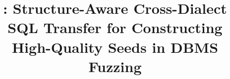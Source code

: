 \documentclass[sigconf,review,anonymous]{acmart}
\begin{document}
\title[\tool{}: Structure-Aware Cross-DBMS SQL Transfer]{\tool{}: Structure-Aware Cross-Dialect SQL Transfer for Constructing High-Quality Seeds in DBMS Fuzzing}



\end{document}
